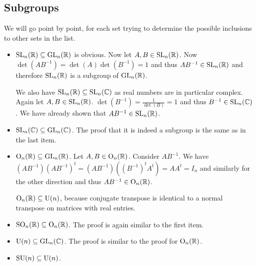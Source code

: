 \subsection{Subgroups}

\begin{problem}
\end{problem}

\begin{solution}
	We will go point by point, for each set trying to determine the possible inclusions to other sets in the list.
	\begin{itemize}
		\item $\mathrm{SL}_n(\mathbb{R}) \subseteq \mathrm{GL}_n(\mathbb{R})$ is obvious. Now let $A, B \in \mathrm{SL}_n(\mathbb{R})$. Now $\det(A B^{-1}) = \det(A) \det(B^{-1}) = 1$ and thus $A B^{-1} \in \mathrm{SL}_n(\mathbb{R})$ and therefore $\mathrm{SL}_n(\mathbb{R})$ is a subgroup of $\mathrm{GL}_n(\mathbb{R})$. 
		
		We also have $\mathrm{SL}_n(\mathbb{R}) \subseteq \mathrm{SL}_n(\mathbb{C})$ as real numbers are in particular complex. Again let $A, B \in \mathrm{SL}_n(\mathbb{R})$. $\det(B^{-1}) = \frac{1}{\det(B)} = 1$ and thus $B^{-1} \in \mathrm{SL}_n(\mathbb{C})$. We have already shown that $A B^{-1} \in \mathrm{SL}_n(\mathbb{R})$.
		
		\item $\mathrm{SL}_n(\mathbb{C}) \subseteq \mathrm{GL}_n(\mathbb{C})$. The proof that it is indeed a subgroup is the same as in the last item.
		
		\item $\mathrm{O}_n(\mathbb{R}) \subseteq \mathrm{GL}_n(\mathbb{R})$. Let $A, B \in \mathrm{O}_n(\mathbb{R})$. Consider $A B^{-1}$. We have $(A B^{-1}) (A B^{-1})^t = (A B^{-1}) ((B^{-1})^t A^t) = A A^t = I_n$ and similarly for the other direction and thus $A B^{-1} \in \mathrm{O}_n(\mathbb{R})$.
		
		$\mathrm{O}_n(\mathbb{R}) \subseteq \mathrm{U}(n)$, because conjugate transpose is identical to a normal transpose on matrices with real entries.
		
		\item $\mathrm{SO}_n(\mathbb{R}) \subseteq \mathrm{O}_n(\mathbb{R})$. The proof is again similar to the first item.
		
		\item $\mathrm{U}(n) \subseteq \mathrm{GL}_n(\mathbb{C})$. The proof is similar to the proof for $\mathrm{O}_n(\mathbb{R})$.
		
		\item $\mathrm{SU}(n) \subseteq \mathrm{U}(n)$. \qedhere
	\end{itemize}
\end{solution}

\begin{problem}
\end{problem}

